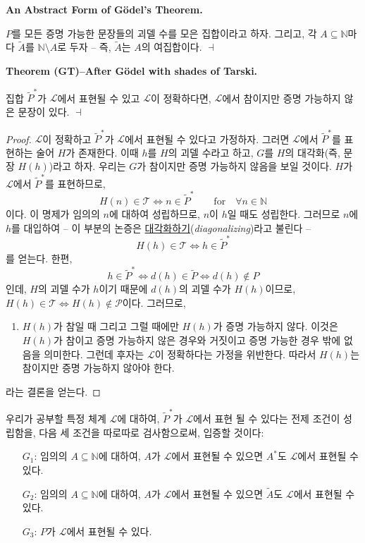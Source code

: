 \documentclass[12pt]{paper}
\newenvironment{context}[1][]
{ \noindent \textbf{{#1}.}
}
{ \hfill $ \dashv $ }
\begin{document}
\begin{context}[An Abstract Form of G\"odel's Theorem]
$P$를 모든 증명 가능한 문장들의 괴델 수를 모은 집합이라고 하자.
그리고, 각 $A \subseteq \mathbb{N}$마다 $\widetilde{A}$를 $\mathbb{N} \setminus A$로 두자 --
즉, $\widetilde{A}$는 $A$의 여집합이다.
\end{context}

\begin{context}[Theorem (GT)--After G\"odel with shades of Tarski]
집합 $\widetilde{P}^{*}$가 $\mathcal{L}$에서 표현될 수 있고 $\mathcal{L}$이 정확하다면,
$\mathcal{L}$에서 참이지만 증명 가능하지 않은 문장이 있다.
\end{context}

\begin{proof}
$\mathcal{L}$이 정확하고 $\widetilde{P}^{*}$가 $\mathcal{L}$에서 표현될 수 있다고 가정하자.
그러면 $\mathcal{L}$에서 $\widetilde{P}^{*}$를 표현하는 술어 $H$가 존재한다.
이때 $h$를 $H$의 괴델 수라고 하고,
$G$를 $H$의 대각화(즉, 문장 $ H \left( h \right) $)라고 하자.
우리는 $G$가 참이지만 증명 가능하지 않음을 보일 것이다.
$H$가 $\mathcal{L}$에서 $\widetilde{P}^{*}$를 표현하므로,
$$ H \left( n \right) \in \mathcal{T} \iff n \in \widetilde{P}^{*} \qquad \mathrm{for} \quad \forall n \in \mathbb{N} $$이다.
이 명제가 임의의 $n$에 대하여 성립하므로,
$n$이 $h$일 때도 성립한다.
그러므로 $n$에 $h$를 대입하여 --
이 부분의 논증은 \underline{대각화하기}(\textit{diagonalizing})라고 불린다 --
$$ H \left( h \right) \in \mathcal{T} \iff h \in \widetilde{P}^{*}$$를 얻는다.
한편, $$h \in \widetilde{P}^{*} \iff d \left( h \right) \in \widetilde{P} \iff d \left( h \right) \notin P$$인데,
$H$의 괴델 수가 $h$이기 때문에 $d \left( h \right)$의 괴델 수가 $H \left( h \right)$이므로,
$ H \left( h \right) \in \mathcal{T} \iff H \left( h \right) \notin \mathcal{P}$이다.
그러므로,
\begin{enumerate}
\item $H \left( h \right)$가 참일 때 그리고 그럴 때에만 $H \left( h \right)$가 증명 가능하지 않다.
이것은 $H \left( h \right)$가 참이고 증명 가능하지 않은 경우와 거짓이고 증명 가능한 경우 밖에 없음을 의미한다.
그런데 후자는 $\mathcal{L}$이 정확하다는 가정을 위반한다.
따라서 $H \left( h \right)$는 참이지만 증명 가능하지 않아야 한다.
\end{enumerate}
라는 결론을 얻는다.
\end{proof}

우리가 공부할 특정 체계 $\mathcal{L}$에 대하여,
$\widetilde{P}^{*}$가 $\mathcal{L}$에서 표현 될 수 있다는 전제 조건이 성립함을,
다음 세 조건을 따로따로 검사함으로써, 입증할 것이다:
\begin{itemize}
\item[$G_1$:] 임의의 $A \subseteq \mathbb{N}$에 대하여, $A$가 $\mathcal{L}$에서 표현될 수 있으면 $A^{*}$도 $\mathcal{L}$에서 표현될 수 있다.
\item[$G_2$:] 임의의 $A \subseteq \mathbb{N}$에 대하여, $A$가 $\mathcal{L}$에서 표현될 수 있으면 $\widetilde{A}$도 $\mathcal{L}$에서 표현될 수 있다.
\item[$G_3$:] $P$가 $\mathcal{L}$에서 표현될 수 있다.
\end{itemize}
\end{document}
